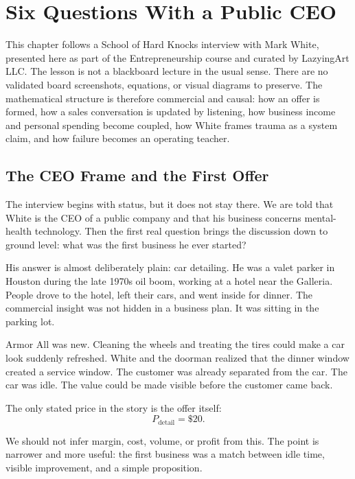\chapter{Six Questions With a Public CEO}

This chapter follows a School of Hard Knocks interview with Mark White, presented here as part of the Entrepreneurship course and curated by LazyingArt LLC. The lesson is not a blackboard lecture in the usual sense. There are no validated board screenshots, equations, or visual diagrams to preserve. The mathematical structure is therefore commercial and causal: how an offer is formed, how a sales conversation is updated by listening, how business income and personal spending become coupled, how White frames trauma as a system claim, and how failure becomes an operating teacher.

\section{The CEO Frame and the First Offer}

The interview begins with status, but it does not stay there. We are told that White is the CEO of a public company and that his business concerns mental-health technology. Then the first real question brings the discussion down to ground level: what was the first business he ever started?

His answer is almost deliberately plain: car detailing. He was a valet parker in Houston during the late 1970s oil boom, working at a hotel near the Galleria. People drove to the hotel, left their cars, and went inside for dinner. The commercial insight was not hidden in a business plan. It was sitting in the parking lot.

Armor All was new. Cleaning the wheels and treating the tires could make a car look suddenly refreshed. White and the doorman realized that the dinner window created a service window. The customer was already separated from the car. The car was idle. The value could be made visible before the customer came back.

The only stated price in the story is the offer itself:
\begin{equation}
P_{\text{detail}}=\$20.
\end{equation}

We should not infer margin, cost, volume, or profit from this. The point is narrower and more useful: the first business was a match between idle time, visible improvement, and a simple proposition.


